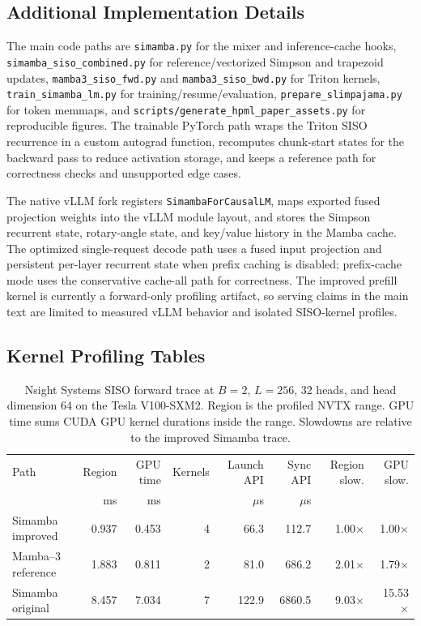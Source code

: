 \documentclass[conference]{IEEEtran}
\newcommand{\modelname}{Simamba\xspace}
\newcommand{\mambathree}{Mamba--3\xspace}
\begin{document}
\FloatBarrier
\clearpage
\subsection{Additional Implementation Details}

The main code paths are \texttt{simamba.py} for the mixer and inference-cache hooks, \texttt{simamba\_siso\_combined.py} for reference/vectorized Simpson and trapezoid updates, \texttt{mamba3\_siso\_fwd.py} and \texttt{mamba3\_siso\_bwd.py} for Triton kernels, \texttt{train\_simamba\_lm.py} for training/resume/evaluation, \texttt{prepare\_slimpajama.py} for token memmaps, and \texttt{scripts/generate\_hpml\_paper\_assets.py} for reproducible figures. The trainable PyTorch path wraps the Triton SISO recurrence in a custom autograd function, recomputes chunk-start states for the backward pass to reduce activation storage, and keeps a reference path for correctness checks and unsupported edge cases.

The native vLLM fork registers \texttt{SimambaForCausalLM}, maps exported fused projection weights into the vLLM module layout, and stores the Simpson recurrent state, rotary-angle state, and key/value history in the Mamba cache. The optimized single-request decode path uses a fused input projection and persistent per-layer recurrent state when prefix caching is disabled; prefix-cache mode uses the conservative cache-all path for correctness. The improved prefill kernel is currently a forward-only profiling artifact, so serving claims in the main text are limited to measured vLLM behavior and isolated SISO-kernel profiles.

\subsection{Kernel Profiling Tables}

\begin{table}[t]
\caption{Nsight Systems SISO forward trace at $B=2$, $L=256$, 32 heads, and head dimension 64 on the Tesla V100-SXM2. Region is the profiled NVTX range. GPU time sums CUDA GPU kernel durations inside the range. Slowdowns are relative to the improved \modelname trace.}
\label{tab:app_nsys_kernel_profile}
\centering
\footnotesize
\begin{tabular}{@{}lrrrrrrr@{}}
\toprule
Path & Region & GPU time & Kernels & Launch API & Sync API & Region slow. & GPU slow.\\
 & ms & ms &  & $\mu$s & $\mu$s &  & \\
\midrule
\modelname{} improved & 0.937 & 0.453 & 4 & 66.3 & 112.7 & 1.00$\times$ & 1.00$\times$\\
\mambathree{} reference & 1.883 & 0.811 & 2 & 81.0 & 686.2 & 2.01$\times$ & 1.79$\times$\\
\modelname{} original & 8.457 & 7.034 & 7 & 122.9 & 6860.5 & 9.03$\times$ & 15.53$\times$\\
\bottomrule
\end{tabular}
\end{table}
\end{document}

